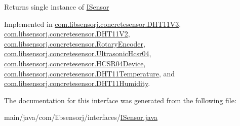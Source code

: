 \begin{DoxyReturn}{Returns}
single instance of \hyperlink{interfacecom_1_1libsensorj_1_1interfaces_1_1ISensor}{I\+Sensor} 
\end{DoxyReturn}


Implemented in \hyperlink{classcom_1_1libsensorj_1_1concretesensor_1_1DHT11V3_a94e402a3ea89ad3ee46725fdd64b4c82}{com.\+libsensorj.\+concretesensor.\+D\+H\+T11\+V3}, \hyperlink{classcom_1_1libsensorj_1_1concretesensor_1_1DHT11V2_afff27f29285f26230faa8ecda6b6b102}{com.\+libsensorj.\+concretesensor.\+D\+H\+T11\+V2}, \hyperlink{classcom_1_1libsensorj_1_1concretesensor_1_1RotaryEncoder_aa0e07b8e5979b940a4a8bcb96d3af51e}{com.\+libsensorj.\+concretesensor.\+Rotary\+Encoder}, \hyperlink{classcom_1_1libsensorj_1_1concretesensor_1_1UltrasonicHcsr04_a170167614b330d79518647a9a9722b62}{com.\+libsensorj.\+concretesensor.\+Ultrasonic\+Hcsr04}, \hyperlink{classcom_1_1libsensorj_1_1concretesensor_1_1HCSR04Device_a3395de7d81b875516fb5c539accb27d1}{com.\+libsensorj.\+concretesensor.\+H\+C\+S\+R04\+Device}, \hyperlink{classcom_1_1libsensorj_1_1concretesensor_1_1DHT11Temperature_a599358623598fb0076dc0a2e07978f0b}{com.\+libsensorj.\+concretesensor.\+D\+H\+T11\+Temperature}, and \hyperlink{classcom_1_1libsensorj_1_1concretesensor_1_1DHT11Humidity_a2355dc003abad8d519440e9f6871c422}{com.\+libsensorj.\+concretesensor.\+D\+H\+T11\+Humidity}.



The documentation for this interface was generated from the following file\+:\begin{DoxyCompactItemize}
\item 
main/java/com/libsensorj/interfaces/\hyperlink{ISensor_8java}{I\+Sensor.\+java}\end{DoxyCompactItemize}
